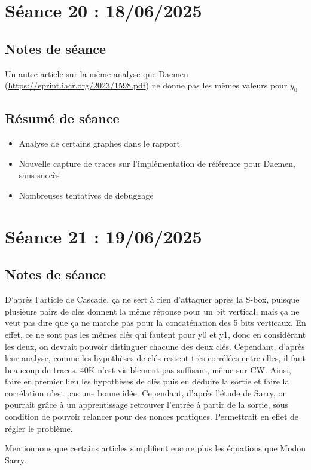 \documentclass[12pt]{article}
\begin{document}
	
	\section{Séance 20 : 18/06/2025}
	\subsection{Notes de séance}
	Un autre article sur la même analyse que Daemen (\url{https://eprint.iacr.org/2023/1598.pdf}) ne donne pas les mêmes valeurs pour $y_0$
	
	\subsection{Résumé de séance}
	\begin{itemize}
		\item Analyse de certains graphes dans le rapport
		\item Nouvelle capture de traces sur l'implémentation de référence pour Daemen, sans succès
		\item Nombreuses tentatives de debuggage
	\end{itemize}
	
	
	\section{Séance 21 : 19/06/2025}
	\subsection{Notes de séance}
	D'après l'article de Cascade, ça ne sert à rien d'attaquer après la S-box, puisque plusieurs pairs de clés donnent la même réponse pour un bit vertical, mais ça ne veut pas dire que ça ne marche pas pour la concaténation des 5 bits verticaux. En effet, ce ne sont pas les mêmes clés qui fautent pour y0 et y1, donc en considérant les deux, on devrait pouvoir distinguer chacune des deux clés. Cependant, d'après leur analyse, comme les hypothèses de clés restent très corrélées entre elles, il faut beaucoup de traces. 40K n'est visiblement pas suffisant, même sur CW. Ainsi, faire en premier lieu les hypothèses de clés puis en déduire la sortie et faire la corrélation n'est pas une bonne idée. Cependant, d'après l'étude de Sarry, on pourrait grâce à un apprentissage retrouver l'entrée à partir de la sortie, sous condition de pouvoir relancer pour des nonces pratiques. Permettrait en effet de régler le problème.
	
	Mentionnons que certains articles simplifient encore plus les équations que Modou Sarry.
	
\end{document}
